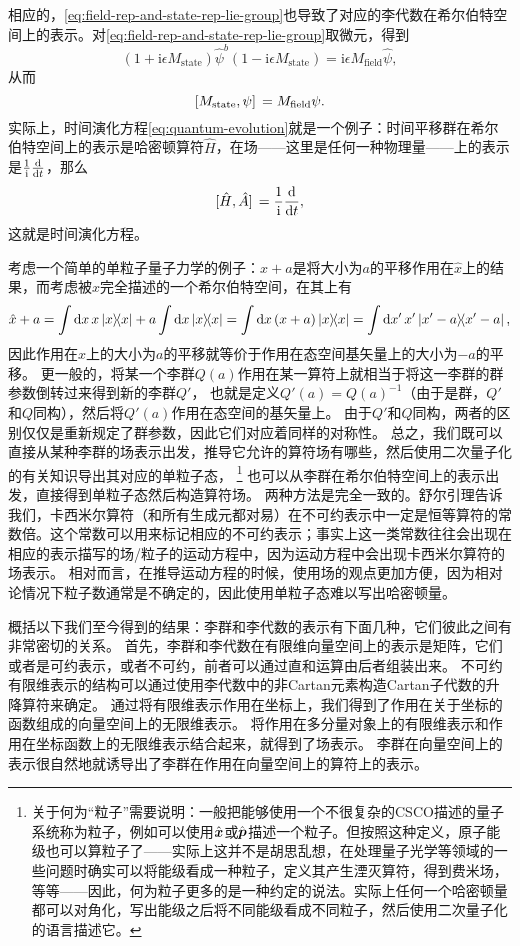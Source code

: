 \documentclass[UTF8, a4paper]{ctexart}
\newcommand*{\ii}{\mathrm{i}}
\begin{document}
相应的，\eqref{eq:field-rep-and-state-rep-lie-group}也导致了对应的李代数在希尔伯特空间上的表示。对\eqref{eq:field-rep-and-state-rep-lie-group}取微元，得到
\[
    (1 + \ii \epsilon M_\text{state}) \hat{\psi}^b (1 - \ii \epsilon M_\text{state}) = \ii \epsilon M_\text{field} \hat{\psi},
\]
从而
\begin{equation}
    \comm*{M_\text{state}}{\psi} = M_\text{field} \psi.
    \label{eq:field-rep-and-state-rep-gen}
\end{equation}
实际上，时间演化方程\eqref{eq:quantum-evolution}就是一个例子：时间平移群在希尔伯特空间上的表示是哈密顿算符$\hat{H}$，在场——这里是任何一种物理量——上的表示是$\frac{1}{\ii} \dv{t}$，那么
\[
    \comm*{\hat{H}}{\hat{A}} = \frac{1}{\ii} \dv{t},
\]
这就是时间演化方程。

考虑一个简单的单粒子量子力学的例子：$\hat{x} + a$是将大小为$a$的平移作用在$\hat{x}$上的结果，而考虑被$\hat{x}$完全描述的一个希尔伯特空间，在其上有
\[
    \hat{x} + a = \int \dd{x} x \dyad{x} + a \int \dd{x} \dyad{x} 
    = \int \dd{x} (x + a) \dyad{x} = \int \dd{x'} x' \dyad{x'-a},
\]
因此作用在$\hat{x}$上的大小为$a$的平移就等价于作用在态空间基矢量上的大小为$-a$的平移。
更一般的，将某一个李群$Q(a)$作用在某一算符上就相当于将这一李群的群参数倒转过来得到新的李群$Q'$，
也就是定义$Q'(a) = Q(a)^{-1}$（由于是群，$Q'$和$Q$同构），然后将$Q'(a)$作用在态空间的基矢量上。
由于$Q'$和$Q$同构，两者的区别仅仅是重新规定了群参数，因此它们对应着同样的对称性。
总之，我们既可以直接从某种李群的场表示出发，推导它允许的算符场有哪些，然后使用二次量子化的有关知识导出其对应的单粒子态，%
\footnote{关于何为“粒子”需要说明：一般把能够使用一个不很复杂的CSCO描述的量子系统称为粒子，例如可以使用$\hat{\vb*{x}}$或$\hat{\vb*{p}}$描述一个粒子。但按照这种定义，原子能级也可以算粒子了——实际上这并不是胡思乱想，在处理量子光学等领域的一些问题时确实可以将能级看成一种粒子，定义其产生湮灭算符，得到费米场，等等——因此，何为粒子更多的是一种约定的说法。实际上任何一个哈密顿量都可以对角化，写出能级之后将不同能级看成不同粒子，然后使用二次量子化的语言描述它。}%
也可以从李群在希尔伯特空间上的表示出发，直接得到单粒子态然后构造算符场。
两种方法是完全一致的。舒尔引理告诉我们，卡西米尔算符（和所有生成元都对易）在不可约表示中一定是恒等算符的常数倍。这个常数可以用来标记相应的不可约表示；事实上这一类常数往往会出现在相应的表示描写的场/粒子的运动方程中，因为运动方程中会出现卡西米尔算符的场表示。
相对而言，在推导运动方程的时候，使用场的观点更加方便，因为相对论情况下粒子数通常是不确定的，因此使用单粒子态难以写出哈密顿量。

概括以下我们至今得到的结果：李群和李代数的表示有下面几种，它们彼此之间有非常密切的关系。
首先，李群和李代数在有限维向量空间上的表示是矩阵，它们或者是可约表示，或者不可约，前者可以通过直和运算由后者组装出来。
不可约有限维表示的结构可以通过使用李代数中的非Cartan元素构造Cartan子代数的升降算符来确定。
通过将有限维表示作用在坐标上，我们得到了作用在关于坐标的函数组成的向量空间上的无限维表示。
将作用在多分量对象上的有限维表示和作用在坐标函数上的无限维表示结合起来，就得到了场表示。
李群在向量空间上的表示很自然地就诱导出了李群在作用在向量空间上的算符上的表示。
\end{document}
